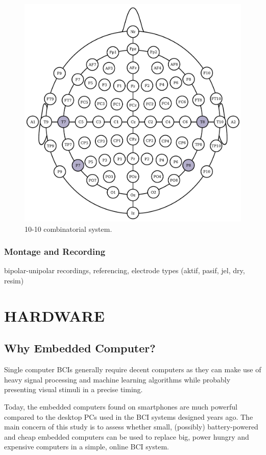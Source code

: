 \documentclass[12pt]{article}
\newcommand\mysection[1]{\vspace*{-0.35cm}\section{#1}\vspace*{6pt}\thispagestyle{empty}}
\newcommand\mysubsection[1]{\subsection{#1}}
\newcommand\mysubsubsection[1]{\subsubsection{#1}}
\numberwithin{equation}{section}
\numberwithin{figure}{section}
\numberwithin{table}{section}
\begin{document}
\begin{figure}[ht]
    \centering
    \includegraphics[scale=0.6]{images/10_20_extended}
    \caption{10-10 combinatorial system.}
    \label{fig:eeg_1020_comb}
\end{figure}

\mysubsubsection{Montage and Recording}\label{seq:eeg_recording}
\par{
bipolar-unipolar recordings, referencing, 
electrode types (aktif, pasif, jel, dry, resim)
}

\clearpage
\vspace*{-0.35cm}
\mysection{HARDWARE}\label{seq:hardware}

\mysubsection{Why Embedded Computer?}\label{seq:embeddedcomputer}

\par{
Single computer BCIs generally require decent computers as they can make use of heavy signal processing 
and machine learning algorithms while probably presenting visual stimuli in a precise timing.
}

\par{
Today, the embedded computers found on smartphones are much powerful compared to the desktop PCs
used in the BCI systems designed years ago. The main concern of this study is to assess whether small,
(possibly) battery-powered and cheap embedded computers can be used to replace big, power hungry and
expensive computers in a simple, online BCI system.
}
\end{document}
